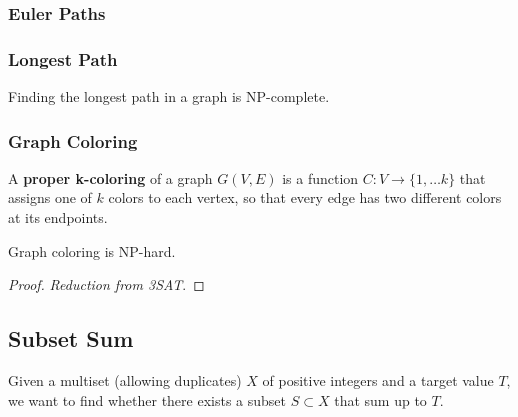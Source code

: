   \subsubsection{Euler Paths}

  \subsubsection{Longest Path}

    \begin{theorem}
      Finding the longest path in a graph is NP-complete. 
    \end{theorem}

  \subsubsection{Graph Coloring} 

    \begin{definition}
      A \textbf{proper k-coloring} of a graph $G(V, E)$ is a function $C: V \rightarrow \{1, \ldots k\}$ that assigns one of $k$ colors to each vertex, so that every edge has two different colors at its endpoints. 
    \end{definition}

    \begin{theorem}
      Graph coloring is NP-hard. 
    \end{theorem}
    \begin{proof}
      \textit{Reduction from 3SAT}. 
    \end{proof}

\subsection{Subset Sum}

  \begin{definition}
    Given a multiset (allowing duplicates) $X$ of positive integers and a target value $T$, we want to find whether there exists a subset $S \subset X$ that sum up to $T$. 
  \end{definition}

